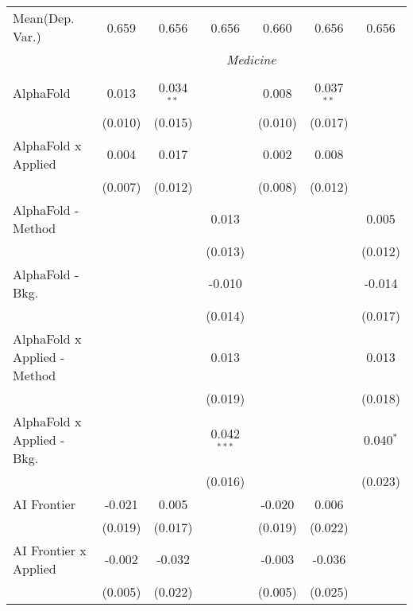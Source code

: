 \begin{tabular}{lcccccc}
Mean(Dep. Var.) & 0.659 & 0.656 & 0.656 & 0.660 & 0.656 & 0.656 \\
 & \multicolumn{6}{c}{\textit{Medicine}} \\ \\
   AlphaFold                      & 0.013   & 0.034$^{**}$ &                & 0.008   & 0.037$^{**}$   &   \\   
                                  & (0.010) & (0.015)      &                & (0.010) & (0.017)        &   \\   
   AlphaFold x Applied            & 0.004   & 0.017        &                & 0.002   & 0.008          &   \\   
                                  & (0.007) & (0.012)      &                & (0.008) & (0.012)        &   \\   
   AlphaFold - Method             &         &              & 0.013          &         &                & 0.005\\   
                                  &         &              & (0.013)        &         &                & (0.012)\\   
   AlphaFold - Bkg.               &         &              & -0.010         &         &                & -0.014\\   
                                  &         &              & (0.014)        &         &                & (0.017)\\   
   AlphaFold x Applied - Method   &         &              & 0.013          &         &                & 0.013\\   
                                  &         &              & (0.019)        &         &                & (0.018)\\   
   AlphaFold x Applied - Bkg.     &         &              & 0.042$^{***}$  &         &                & 0.040$^{*}$\\   
                                  &         &              & (0.016)        &         &                & (0.023)\\   
   AI Frontier                    & -0.021  & 0.005        &                & -0.020  & 0.006          &   \\   
                                  & (0.019) & (0.017)      &                & (0.019) & (0.022)        &   \\   
   AI Frontier x Applied          & -0.002  & -0.032       &                & -0.003  & -0.036         &   \\   
                                  & (0.005) & (0.022)      &                & (0.005) & (0.025)        &   \\   

\end{tabular}
